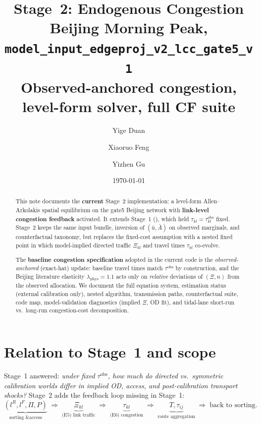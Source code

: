 \documentclass[12pt]{article}
\title{Stage~2: Endogenous Congestion\\[0.4em]
\large Beijing Morning Peak, \texttt{model\_input\_edgeproj\_v2\_lcc\_gate5\_v1}\\[0.2em]
\normalsize Observed-anchored congestion, level-form solver, full CF suite}
\author{Yige Duan \and Xiaoruo Feng \and Yizhen Gu}
\date{\today}
\newcommand{\ubar}{\bar u}
\newcommand{\Abar}{\bar A}
\newcommand{\obs}{\mathrm{obs}}
\begin{document}
\maketitle

\begin{abstract}
\noindent
This note documents the \textbf{current} Stage~2 implementation: a level-form
Allen--Arkolakis spatial equilibrium on the gate5 Beijing network with
\textbf{link-level congestion feedback} activated.
It extends Stage~1 (), which held
$\tau_{kl}=\tau^{\obs}_{kl}$ fixed.
Stage~2 keeps the same input bundle, inversion of $(\ubar,\Abar)$ on observed
marginals, and counterfactual taxonomy, but replaces the fixed-cost assumption
with a nested fixed point in which model-implied directed traffic $\Xi_{kl}$
and travel times $\tau_{kl}$ co-evolve.

The \textbf{baseline congestion specification} adopted in the current code is
the \emph{observed-anchored} (exact-hat) update: baseline travel times match
$\tau^{\obs}$ by construction, and the Beijing literature elasticity
$\lambda_{\mathrm{phys}}=1.1$ acts only on \emph{relative} deviations of
$(\Xi,n)$ from the observed allocation.
We document the full equation system, estimation status (external calibration
only), nested algorithm, transmission paths, counterfactual suite, code map,
model-validation diagnostics (implied $\Xi$, OD fit), and tidal-lane
short-run vs.\ long-run congestion-cost decomposition.
\end{abstract}

\tableofcontents
\newpage

\section{Relation to Stage~1 and scope}\label{sec:scope}

Stage~1 answered: \emph{under fixed $\tau^{\obs}$, how much do directed vs.\
symmetric calibration worlds differ in implied OD, access, and post-calibration
transport shocks?}
Stage~2 adds the feedback loop missing in Stage~1:
\begin{equation}\label{eq:feedback_loop}
  \underbrace{(l^R,l^F,\Pi,P)}_{\text{sorting \& access}}
  \;\Longrightarrow\;
  \underbrace{\Xi_{kl}}_{\text{(E5) link traffic}}
  \;\Longrightarrow\;
  \underbrace{\tau_{kl}}_{\text{(E6) congestion}}
  \;\Longrightarrow\;
  \underbrace{T,\tau_{ij}}_{\text{route aggregation}}
  \;\Longrightarrow\;
  \text{back to sorting}.
\end{equation}
\end{document}

